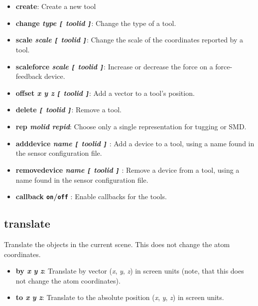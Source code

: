   \begin{itemize}
    \item {\bf  create}: Create a new tool
    \item {\bf  change {\it type {\tt [} toolid\/ {\tt ]}}}: Change the
    type of a tool.
    \item {\bf  scale {\it scale {\tt [} toolid\/ {\tt ]}}}: Change the
    scale of the coordinates reported by a tool.
    \item {\bf  scaleforce {\it scale {\tt [} toolid\/ {\tt ]}}}: Increase
    or decrease the force on a force-feedback device.
    \item {\bf  offset {\it x y z\/ {\tt [} toolid\/ {\tt ]}}}: Add a
    vector to a tool's position.
    \item {\bf  delete \it {\tt [} toolid\/ {\tt ]}}: Remove a tool.
    \item {\bf  rep \it molid repid\/}: 
    Choose only a single representation for tugging or SMD.
    \item {\bf  adddevice \it name\/ {\tt [} toolid\/ {\tt ]} }: Add a
    device to a tool, using a name found in the sensor configuration
    file.
    \item {\bf  removedevice \it name\/ {\tt [} toolid\/ {\tt ]} }:
    Remove a device from a tool, using a name found in the sensor
    configuration file.

    \item {\bf  callback {\tt on}/{\tt off} }: Enable callbacks for
    the tools.
  \end{itemize}


  \subsection{translate}
Translate the objects in the current scene.
This does not change the atom coordinates.

  \begin{itemize}
    \item {\bf  by {\it x} {\it y} {\it z}}: Translate by vector ({\it x}, {\it y},
{\it z}) in screen units (note, that  
this does not change the atom coordinates).
    \item {\bf  to {\it x} {\it y} {\it z}}: Translate to the absolute position 
({\it x}, {\it y}, {\it z}) in screen units.
  \end{itemize}




